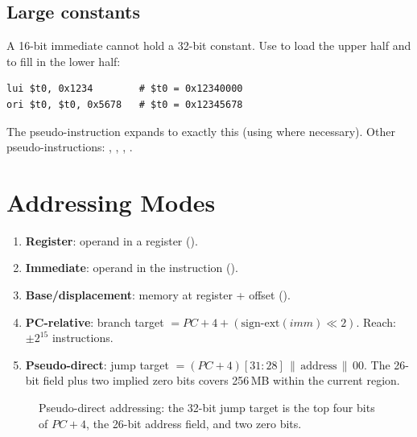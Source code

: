 \subsection{Large constants}

A 16-bit immediate cannot hold a 32-bit constant. Use  to load the
upper half and  to fill in the lower half:
\begin{lstlisting}[style=mips]
lui $t0, 0x1234        # $t0 = 0x12340000
ori $t0, $t0, 0x5678   # $t0 = 0x12345678
\end{lstlisting}
The pseudo-instruction  expands to exactly this
(using  where necessary). Other pseudo-instructions: ,
, , .

\section{Addressing Modes}

\begin{enumerate}
  \item \textbf{Register}: operand in a register ().
  \item \textbf{Immediate}: operand in the instruction ().
  \item \textbf{Base/displacement}: memory at register + offset ().
  \item \textbf{PC-relative}: branch target $= PC + 4 + (\text{sign-ext}(imm) \ll 2)$.
    Reach: $\pm 2^{15}$ instructions.
  \item \textbf{Pseudo-direct}: jump target
    $= (PC+4)[31{:}28] \,\|\, \text{address} \,\|\, 00$. The 26-bit field
    plus two implied zero bits covers 256\,MB within the current region.
\end{enumerate}

\begin{figure}[H]
\centering
{}
\caption{Pseudo-direct addressing: the 32-bit jump target is the top four
bits of $PC+4$, the 26-bit address field, and two zero bits.}
\end{figure}

